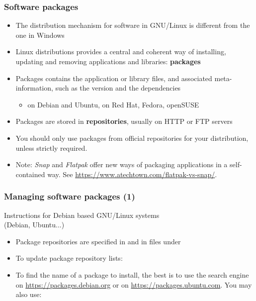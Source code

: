 \begin{frame}
  \frametitle{Software packages}
  \begin{itemize}
  \item The distribution mechanism for software in GNU/Linux is
    different from the one in Windows
  \item Linux distributions provides a central and coherent way of
    installing, updating and removing applications and libraries:
    {\bf packages}
  \item Packages contains the application or library files, and
    associated meta-information, such as the version and the
    dependencies
    \begin{itemize}
    \item {} on Debian and Ubuntu,  on Red Hat,
      Fedora, openSUSE
    \end{itemize}
  \item Packages are stored in {\bf repositories}, usually on HTTP or
    FTP servers
  \item You should only use packages from official repositories for your
    distribution, unless strictly required.
  \item Note: {\em Snap} and {\em Flatpak} offer new ways of packaging
    applications in a self-contained way. See
    \url{https://www.atechtown.com/flatpak-vs-snap/}.

\end{itemize}
\end{frame}

\begin{frame}
  \frametitle{Managing software packages (1)}
  Instructions for Debian based GNU/Linux systems\\
  (Debian, Ubuntu...)
  \begin{itemize}
  \item Package repositories are specified in 
	and in files under 
  \item To update package repository lists:\\
  \item To find the name of a package to install, the best is to use
    the search engine on \url{https://packages.debian.org} or on
    \url{https://packages.ubuntu.com}. You may
    also use:\\
  \end{itemize}
\end{frame}

